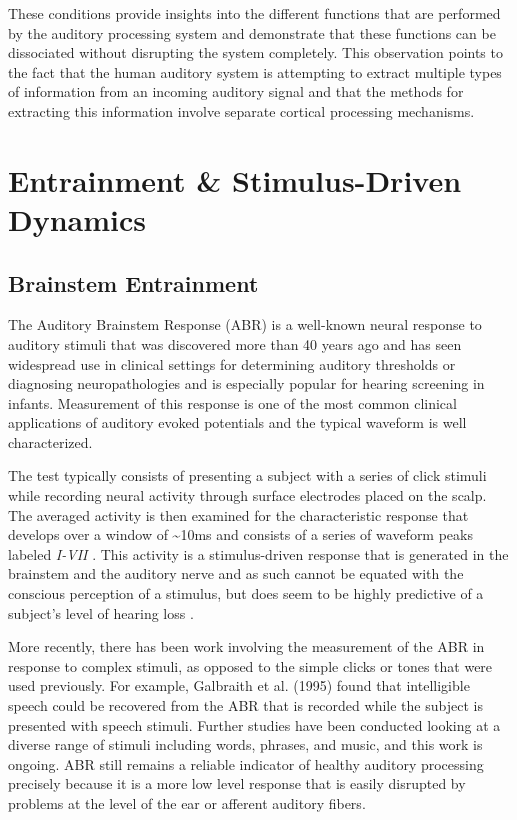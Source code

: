 \documentclass[titlepage]{article}
\begin{document}
    These conditions provide insights into the different functions that are
    performed by the auditory processing system and demonstrate that these
    functions can be dissociated without disrupting the system completely. This
    observation points to the fact that the human auditory system is attempting
    to extract multiple types of information from an incoming auditory signal
    and that the methods for extracting this information involve separate
    cortical processing mechanisms.


\section{Entrainment \& Stimulus-Driven Dynamics} \label{entrainment}

  \subsection{Brainstem Entrainment} \label{brainstemEntrainment}

    The Auditory Brainstem Response (ABR) is a well-known neural response to
    auditory stimuli that was discovered more than 40 years ago
    \cite{Jewett1971,Jewett1970} and has seen widespread use in clinical
    settings for determining auditory thresholds or diagnosing neuropathologies
    \cite{Skoe2010} and is especially popular for hearing screening in infants.
    Measurement of this response is one of the most common clinical applications
    of auditory evoked potentials and the typical waveform is well
    characterized.

    The test typically consists of presenting a subject with a series of click
    stimuli while recording neural activity through surface electrodes placed on
    the scalp. The averaged activity is then examined for the characteristic
    response that develops over a window of \textasciitilde 10ms and consists
    of a series of waveform peaks labeled \textit{I-VII}
    \cite{Sininger1993,Bhattacharyya2017}. This activity is a stimulus-driven
    response that is generated in the brainstem and the auditory nerve and as
    such cannot be equated with the conscious perception of a stimulus, but
    does seem to be highly predictive of a subject's level of hearing loss
    \cite{Sininger1993}.

    More recently, there has been work involving the measurement of the ABR in
    response to complex stimuli, as opposed to the simple clicks or tones that
    were used previously. For example, Galbraith et al. (1995)
    \cite{Galbraith1995} found that intelligible speech could be recovered from
    the ABR that is recorded while the subject is presented with speech stimuli.
    Further studies have been conducted looking at a diverse range of stimuli
    including words, phrases, and music, and this work is ongoing. ABR still 
    remains a reliable indicator of healthy auditory processing precisely 
    because it is a more low level response that is easily disrupted by problems
    at the level of the ear or afferent auditory fibers.
\end{document}
